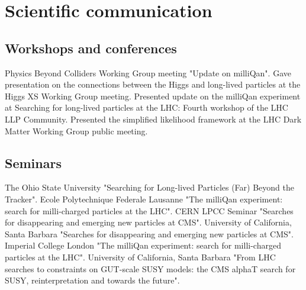 %

\section{Scientific communication}
\subsection{Workshops and conferences}
 {Physics Beyond Colliders Working Group meeting "Update on milliQan".}
\vspace{0.1cm}
 {Gave presentation on the connections between the Higgs and long-lived particles at the Higgs XS Working Group meeting.}
\vspace{0.1cm}
 {Presented update on the milliQan experiment at Searching for long-lived particles at the LHC: Fourth workshop of the LHC LLP Community.}
\vspace{0.1cm}
 {Presented the simplified likelihood framework at the LHC Dark Matter Working Group public meeting.}
\vspace{0.1cm}
\vspace{0.1cm}
\vspace{0.1cm}
\subsection{Seminars}
 {The Ohio State University "Searching for Long-lived Particles (Far) Beyond the Tracker".}
\vspace{0.1cm}
 {Ecole Polytechnique Federale Lausanne "The milliQan experiment: search for milli-charged particles at the LHC".}
\vspace{0.1cm}
 {CERN LPCC Seminar "Searches for disappearing and emerging new particles at CMS".}
\vspace{0.1cm}
 {University of California, Santa Barbara "Searches for disappearing and emerging new particles at CMS".}
\vspace{0.1cm}
 {Imperial College London "The milliQan experiment: search for milli-charged particles at the LHC".}
\vspace{0.1cm}
 {University of California, Santa Barbara "From LHC searches to constraints on GUT-scale SUSY models: the CMS alphaT search for SUSY, reinterpretation and towards the future".}
\vspace{0.1cm}

